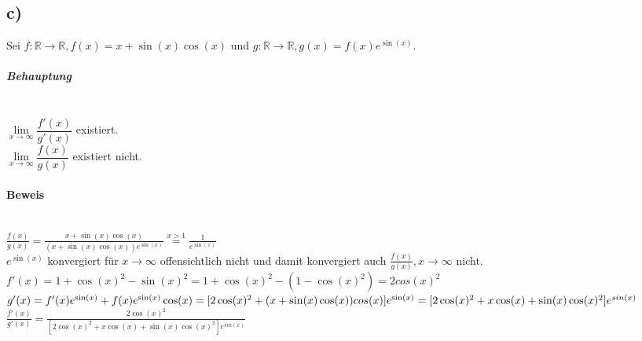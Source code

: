 \subsection*{c)}
Sei $ f:\mathbb{R} \to \mathbb{R},f(x) = x + \sin(x)\cos(x) $
und $ g:\mathbb{R} \to \mathbb{R},g(x) = f(x)e^{\sin(x)} $.

\subparagraph*{Behauptung} ~\\
\indent $\lim\limits_{x \to \infty} \dfrac{f'(x)}{g'(x)}$ existiert.\\
\indent $\lim\limits_{x \to \infty} \dfrac{f(x)}{g(x)}$ existiert nicht.

\paragraph*{Beweis} ~\\

$ \frac{f(x)}{g(x)} 
= \frac{x+\sin(x)\cos(x)}{(x+\sin(x)\cos(x))e^{\sin(x)}}
\overset{x > 1}{=} \frac{1}{e^{\sin(x)}}$ \\

$ e^{\sin(x)} $ konvergiert für $x \to \infty$ offensichtlich nicht und damit konvergiert auch $ \frac{f(x)}{g(x)} , x \to \infty$ nicht. \\

$ f'(x) = 1 + \cos(x)^{2}-\sin(x)^{2} = 1 + \cos(x)^{2}-(1-\cos(x)^{2}) = 2 cos(x)^{2}$ \\

$ g'(x) = f'(x)e^{\sin(x)}+f(x)e^{\sin(x)}\cos(x) \\
= [2\cos(x)^{2} + (x + \sin(x)\cos(x))cos(x)]e^{\sin(x)} \\
= [2\cos(x)^{2} + x\cos(x) + \sin(x)\cos(x)^{2}]e^{sin(x)} $ \\

$\frac{f'(x)}{g'(x)} = \frac{2\cos(x)^{2}}{[2\cos(x)^{2} + x\cos(x) + \sin(x)\cos(x)^{2}]e^{sin(x)}}$

